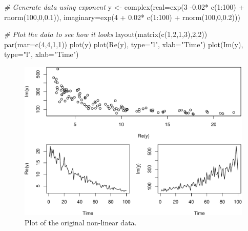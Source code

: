 \documentclass[
]{book}
\newenvironment{Shaded}{\begin{snugshade}}{\end{snugshade}}
\newcommand{\AttributeTok}[1]{\textcolor[rgb]{0.77,0.63,0.00}{#1}}
\newcommand{\CommentTok}[1]{\textcolor[rgb]{0.56,0.35,0.01}{\textit{#1}}}
\newcommand{\DecValTok}[1]{\textcolor[rgb]{0.00,0.00,0.81}{#1}}
\newcommand{\FloatTok}[1]{\textcolor[rgb]{0.00,0.00,0.81}{#1}}
\newcommand{\FunctionTok}[1]{\textcolor[rgb]{0.00,0.00,0.00}{#1}}
\newcommand{\NormalTok}[1]{#1}
\newcommand{\OtherTok}[1]{\textcolor[rgb]{0.56,0.35,0.01}{#1}}
\newcommand{\SpecialCharTok}[1]{\textcolor[rgb]{0.00,0.00,0.00}{#1}}
\newcommand{\StringTok}[1]{\textcolor[rgb]{0.31,0.60,0.02}{#1}}
\begin{document}
\begin{Shaded}
\begin{Highlighting}[]
\CommentTok{\# Generate data using exponent}
\NormalTok{y }\OtherTok{\textless{}{-}} \FunctionTok{complex}\NormalTok{(}\AttributeTok{real=}\FunctionTok{exp}\NormalTok{(}\DecValTok{3} \SpecialCharTok{{-}}\FloatTok{0.02}\SpecialCharTok{*} \FunctionTok{c}\NormalTok{(}\DecValTok{1}\SpecialCharTok{:}\DecValTok{100}\NormalTok{) }\SpecialCharTok{+} \FunctionTok{rnorm}\NormalTok{(}\DecValTok{100}\NormalTok{,}\DecValTok{0}\NormalTok{,}\FloatTok{0.1}\NormalTok{)),}
             \AttributeTok{imaginary=}\FunctionTok{exp}\NormalTok{(}\DecValTok{4} \SpecialCharTok{+} \FloatTok{0.02}\SpecialCharTok{*} \FunctionTok{c}\NormalTok{(}\DecValTok{1}\SpecialCharTok{:}\DecValTok{100}\NormalTok{) }\SpecialCharTok{+} \FunctionTok{rnorm}\NormalTok{(}\DecValTok{100}\NormalTok{,}\DecValTok{0}\NormalTok{,}\FloatTok{0.2}\NormalTok{)))}

\CommentTok{\# Plot the data to see how it looks}
\FunctionTok{layout}\NormalTok{(}\FunctionTok{matrix}\NormalTok{(}\FunctionTok{c}\NormalTok{(}\DecValTok{1}\NormalTok{,}\DecValTok{2}\NormalTok{,}\DecValTok{1}\NormalTok{,}\DecValTok{3}\NormalTok{),}\DecValTok{2}\NormalTok{,}\DecValTok{2}\NormalTok{))}
\FunctionTok{par}\NormalTok{(}\AttributeTok{mar=}\FunctionTok{c}\NormalTok{(}\DecValTok{4}\NormalTok{,}\DecValTok{4}\NormalTok{,}\DecValTok{1}\NormalTok{,}\DecValTok{1}\NormalTok{))}
\FunctionTok{plot}\NormalTok{(y)}
\FunctionTok{plot}\NormalTok{(}\FunctionTok{Re}\NormalTok{(y), }\AttributeTok{type=}\StringTok{"l"}\NormalTok{, }\AttributeTok{xlab=}\StringTok{"Time"}\NormalTok{)}
\FunctionTok{plot}\NormalTok{(}\FunctionTok{Im}\NormalTok{(y), }\AttributeTok{type=}\StringTok{"l"}\NormalTok{, }\AttributeTok{xlab=}\StringTok{"Time"}\NormalTok{)}
\end{Highlighting}
\end{Shaded}

\begin{figure}
\centering
\includegraphics{Svetunkov---Svetunkov---Complex-Valued-Econometrics_files/figure-latex/nonlinearData-1.pdf}
\caption{\label{fig:nonlinearData}Plot of the original non-linear data.}
\end{figure}
\end{document}
